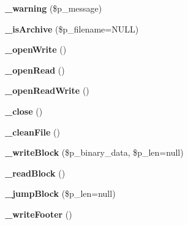\begin{DoxyCompactItemize}
\item 
\hypertarget{classArchive__Tar_ae34a3694e088cb037a3826909c6cd921}{
{\bfseries \_\-warning} (\$p\_\-message)}
\label{classArchive__Tar_ae34a3694e088cb037a3826909c6cd921}

\item 
\hypertarget{classArchive__Tar_ac0f32fdc2fb105b9b79e91ad0b5e02ba}{
{\bfseries \_\-isArchive} (\$p\_\-filename=NULL)}
\label{classArchive__Tar_ac0f32fdc2fb105b9b79e91ad0b5e02ba}

\item 
\hypertarget{classArchive__Tar_ab03c71d896e70777b48a8674023d77b3}{
{\bfseries \_\-openWrite} ()}
\label{classArchive__Tar_ab03c71d896e70777b48a8674023d77b3}

\item 
\hypertarget{classArchive__Tar_a2848d525c6a8e6eca237f4c29d76784f}{
{\bfseries \_\-openRead} ()}
\label{classArchive__Tar_a2848d525c6a8e6eca237f4c29d76784f}

\item 
\hypertarget{classArchive__Tar_a66e4be9c41e2f9217fe6e5cf3d4c6f19}{
{\bfseries \_\-openReadWrite} ()}
\label{classArchive__Tar_a66e4be9c41e2f9217fe6e5cf3d4c6f19}

\item 
\hypertarget{classArchive__Tar_a6d55be0439596d6f2b822e520264c5b2}{
{\bfseries \_\-close} ()}
\label{classArchive__Tar_a6d55be0439596d6f2b822e520264c5b2}

\item 
\hypertarget{classArchive__Tar_a6ca4ad7e63d5e3dcc160777857226958}{
{\bfseries \_\-cleanFile} ()}
\label{classArchive__Tar_a6ca4ad7e63d5e3dcc160777857226958}

\item 
\hypertarget{classArchive__Tar_afece7824027ce39cd46a548ca7ab5a1b}{
{\bfseries \_\-writeBlock} (\$p\_\-binary\_\-data, \$p\_\-len=null)}
\label{classArchive__Tar_afece7824027ce39cd46a548ca7ab5a1b}

\item 
\hypertarget{classArchive__Tar_ae3ab4ee98df3c2fa19fe53b35d151659}{
{\bfseries \_\-readBlock} ()}
\label{classArchive__Tar_ae3ab4ee98df3c2fa19fe53b35d151659}

\item 
\hypertarget{classArchive__Tar_ad335a8945221b6767420e1ded5c9ae93}{
{\bfseries \_\-jumpBlock} (\$p\_\-len=null)}
\label{classArchive__Tar_ad335a8945221b6767420e1ded5c9ae93}

\item 
\hypertarget{classArchive__Tar_af6dd5bd55c7afbb8980216c76bfffcbc}{
{\bfseries \_\-writeFooter} ()}
\label{classArchive__Tar_af6dd5bd55c7afbb8980216c76bfffcbc}


\end{DoxyCompactItemize}

